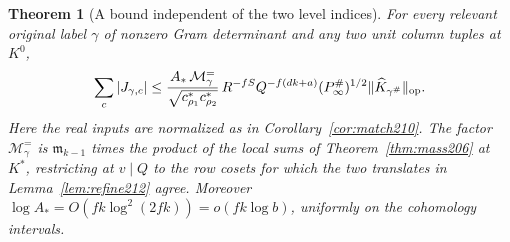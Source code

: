 \documentclass[a4paper,11pt]{article}
\newtheorem{theorem}[proposition]{Theorem}
\theoremstyle{definition}
\theoremstyle{remark}
\numberwithin{equation}{section}
\begin{document}
\begin{theorem}[A bound independent of the two level indices]
\label{thm:norm212}
For every relevant original label \(\gamma\) of nonzero Gram
determinant and any two unit column tuples at \(K^0\),
\[
 \sum_c|J_{\gamma,c}|
 \le
 \frac{A_*\,\mathcal M_\gamma^{=}}
      {\sqrt{c_{\rho_1}^*c_{\rho_2}^*}}\,
 R^{-fS}Q^{-f(dk+a)}(P_\infty^\#)^{1/2}
                        \|\widehat K_{\gamma^\#}\|_{\rm op}.
\]
Here the real inputs are normalized as in Corollary~\ref{cor:match210}.
The factor \(\mathcal M_\gamma^{=}\) is \(\mathfrak m_{k-1}\)
times the product of the local sums of Theorem~\ref{thm:mass206}
at \(K^*\), restricting at \(v\mid Q\) to the row cosets for which
the two translates in Lemma~\ref{lem:refine212} agree. Moreover
\(\log A_*=O(fk\log^2(2fk))=o(fk\log b)\), uniformly on the
cohomology intervals.
\end{theorem}
\end{document}
